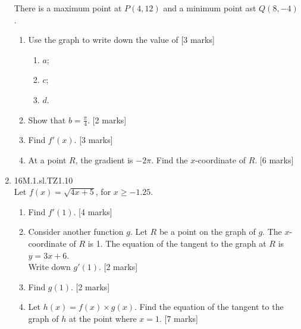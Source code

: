 \documentclass[12pt, twoside]{article}
\begin{document}
\begin{enumerate}
\begin{center}
      \end{center}
      There is a maximum point at $P(4,12)$ and a minimum point ast $Q(8, -4)$.
      \begin{enumerate}
        \item Use the graph to write down the value of [3 marks]
          \begin{enumerate}
            \item $a$;
            \item $c$;
            \item $d$.
          \end{enumerate}
        \item Show that $b= \frac{\pi}{4}$. [2 marks]
        \item Find $f'(x)$. [3 marks]
        \item At a point $R$, the gradient is $-2 \pi$. Find the $x$-coordinate of $R$. [6 marks]
      \end{enumerate}

    \item 16M.1.sl.TZ1.10\\
    Let $f(x)=\sqrt{4x+5}$, for $x \geq -1.25$.
    \begin{enumerate}
      \item Find $f'(1)$. [4 marks]
      \item Consider another function $g$. Let $R$ be a point on the graph of $g$. The $x$-coordinate of $R$ is 1. The equation of the tangent to the graph at $R$ is  $y=3x+6$.\\
      Write down $g'(1)$. [2 marks]
      \item Find $g(1)$. [2 marks]
      \item Let $h(x)=f(x) \times g(x)$. Find the equation of the tangent to the graph of $h$ at the point where $x=1$. [7 marks]
    \end{enumerate}

\end{enumerate}
\end{document}
